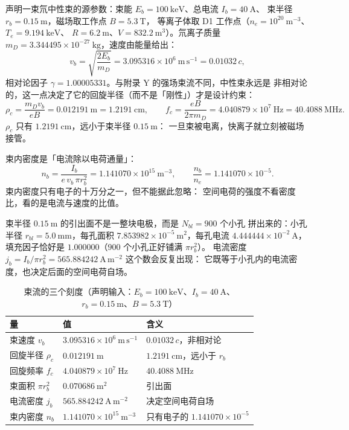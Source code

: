 声明一束氘中性束的源参数：束能 $E_b=100\ \mathrm{keV}$、总电流 $I_b=40\ \mathrm{A}$、
束半径 $r_b=0.15\ \mathrm{m}$，磁场取工作点 $B=5.3\ \mathrm{T}$，
等离子体取 D1 工作点（$n_e=10^{20}\ \mathrm{m^{-3}}$、$T_e=9.194\ \mathrm{keV}$、
$R=6.2\ \mathrm{m}$、$V=832.2\ \mathrm{m^3}$）。氘离子质量
$m_D=3.344495\times10^{-27}\ \mathrm{kg}$，速度由能量给出：
\begin{equation}
v_b=\sqrt{\frac{2E_b}{m_D}}=3.095316\times10^{6}\ \mathrm{m\,s^{-1}}
=0.01032\,c,
\label{eq:app-ax-kin}
\end{equation}
相对论因子 $\gamma=1.00005331$。与附录 Y 的强场束流不同，中性束永远是
非相对论的，这一点决定了它的回旋半径（而不是「刚性」）才是设计约束：
\begin{equation}
\rho_c=\frac{m_Dv_b}{eB}=0.012191\ \mathrm{m}=1.2191\ \mathrm{cm},
\qquad
f_c=\frac{eB}{2\pi m_D}=4.040879\times10^{7}\ \mathrm{Hz}=40.4088\ \mathrm{MHz}.
\label{eq:app-ax-larmor}
\end{equation}
$\rho_c$ 只有 $1.2191\ \mathrm{cm}$，远小于束半径 $0.15\ \mathrm{m}$：
一旦束被电离，快离子就立刻被磁场接管。

束内密度是「电流除以电荷通量」：
\begin{equation}
n_b=\frac{I_b}{e\,v_b\,\pi r_b^2}=1.141070\times10^{15}\ \mathrm{m^{-3}},
\qquad
\frac{n_b}{n_e}=1.141070\times10^{-5}.
\label{eq:app-ax-nb}
\end{equation}
束内密度只有电子的十万分之一，但不能据此忽略：
空间电荷的强度不看密度比，看的是电流与速度的比值。

束半径 $0.15\ \mathrm{m}$ 的引出面不是一整块电极，而是 $N_{bl}=900$ 个小孔
拼出来的：小孔半径 $r_{bl}=5.0\ \mathrm{mm}$，每孔面积
$7.853982\times10^{-5}\ \mathrm{m^2}$，每孔电流 $4.444444\times10^{-2}\ \mathrm{A}$，
填充因子恰好是 $1.000000$（$900$ 个小孔正好铺满 $\pi r_b^2$）。
电流密度 $j_b=I_b/\pi r_b^2=565.884242\ \mathrm{A\,m^{-2}}$ 这个数会反复出现：
它既等于小孔内的电流密度，也决定后面的空间电荷自场。

\begin{table}[htbp]
\centering
\small
\caption{束流的三个刻度（声明输入：$E_b=100\ \mathrm{keV}$、$I_b=40\ \mathrm{A}$、$r_b=0.15\ \mathrm{m}$、$B=5.3\ \mathrm{T}$）}
\label{tab:app-ax-scales}
\begin{tabular}{p{4.6cm}p{4.2cm}p{4.4cm}}
\hline
量 & 值 & 含义 \\
\hline
束速度 $v_b$ & $3.095316\times10^{6}\ \mathrm{m\,s^{-1}}$ & $0.01032\,c$，非相对论 \\
回旋半径 $\rho_c$ & $0.012191\ \mathrm{m}$ & $1.2191\ \mathrm{cm}$，远小于 $r_b$ \\
回旋频率 $f_c$ & $4.040879\times10^{7}\ \mathrm{Hz}$ & $40.4088\ \mathrm{MHz}$ \\
束面积 $\pi r_b^2$ & $0.070686\ \mathrm{m^2}$ & 引出面 \\
电流密度 $j_b$ & $565.884242\ \mathrm{A\,m^{-2}}$ & 决定空间电荷自场 \\
束内密度 $n_b$ & $1.141070\times10^{15}\ \mathrm{m^{-3}}$ & 只有电子的 $1.141070\times10^{-5}$ \\
\hline
\end{tabular}
\end{table}

